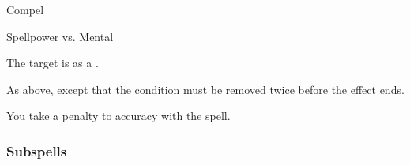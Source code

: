 \newpage
\begin{spellsection}{Compel}

\begin{spellheader}
\end{spellheader}

\begin{spellcontent}

\begin{spelltargetinginfo}




\end{spelltargetinginfo}


\begin{spelleffects}




\begin{spellattack}{Spellpower vs. Mental}


\spellsuccess The target is \immobilized as a .


\spellcritical
As above, except that the condition must be removed twice before the effect ends.



\end{spellattack}





\end{spelleffects}

\end{spellcontent}
\begin{spellfooter}


\end{spellfooter}
\begin{spellsubcontent}


\begin{spellcantrip}

You take a  penalty to accuracy with the spell.

\end{spellcantrip}


\end{spellsubcontent}
\end{spellsection}


\subsubsection{Subspells}


